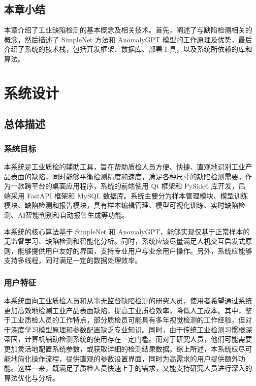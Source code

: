 \documentclass[
  ]{njuthesis}
\begin{document}
\section{本章小结}

本章介绍了工业缺陷检测的基本概念及相关技术。首先，阐述了与缺陷检测相关的概念，然后描述了 SimpleNet 方法和 AnomalyGPT 模型的工作原理及优势，最后介绍了系统的技术栈，包括开发框架、数据库、部署工具，以及系统所依赖的库和算法。

\chapter{系统设计}

\section{总体描述}

\subsection{系统目标}

本系统是工业质检的辅助工具，旨在帮助质检人员方便、快捷、直观地识别工业产品表面的缺陷，同时能够平衡检测精度和速度，满足各种尺寸的缺陷检测需要。作为一款跨平台的桌面应用程序，系统的前端使用 Qt 框架和 PySide6 库开发，后端采用 FastAPI 框架和 MySQL 数据库。系统主要分为样本管理模块、模型训练模块、缺陷检测和报告模块，具有样本编辑管理、模型可视化训练、实时缺陷检测、AI智能判别和自动报告生成等功能。

本系统的核心算法基于 SimpleNet 和 AnomalyGPT，能够实现仅基于正常样本的无监督学习、缺陷检测和智能化分析。同时，系统应该尽量满足人机交互启发式原则，能够提供用户友好的界面，支持专业用户与业余用户操作。另外，系统应能够支持多线程，同时满足一定的数据处理效率。

\subsection{用户特征}

本系统面向工业质检人员和从事无监督缺陷检测的研究人员，使用者希望通过系统更加高效地检测工业产品表面缺陷，提高工业质检效率，降低人工成本。其中，鉴于工业质检人员的工作特点，部分质检员可能具有多年视觉检测的工作经验，但对于深度学习模型原理和参数配置缺乏专业知识。同时，由于传统工业检测习惯根深蒂固，计算机辅助检测系统的使用存在一定门槛。而对于研究人员，他们可能需要更加灵活地配置系统参数，或获取详细的检测结果数据。综上所述，本系统应尽可能地简化操作流程，提供直观的参数设置界面，同时为高需求的用户提供额外功能。这样一来，既满足了质检人员快速上手的需求，又能支持研究人员进行深入的算法优化与分析。
\end{document}
